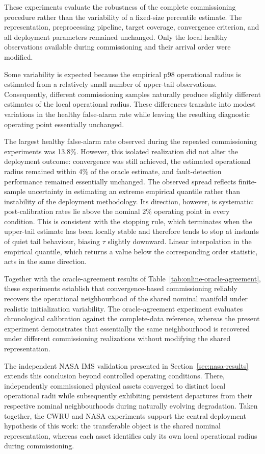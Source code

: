 \documentclass{trbunofficial}
\begin{document}
These experiments evaluate the robustness of the complete commissioning
procedure rather than the variability of a fixed-size percentile estimate.
The representation, preprocessing pipeline, target coverage, convergence
criterion, and all deployment parameters remained unchanged. Only the local
healthy observations available during commissioning and their arrival order
were modified.

Some variability is expected because the empirical p98 operational radius is
estimated from a relatively small number of upper-tail observations.
Consequently, different commissioning samples naturally produce slightly
different estimates of the local operational radius. These differences
translate into modest variations in the healthy false-alarm rate while
leaving the resulting diagnostic operating point essentially unchanged.

The largest healthy false-alarm rate observed during the repeated
commissioning experiments was 13.8\%. However, this isolated realization did
not alter the deployment outcome: convergence was still achieved, the
estimated operational radius remained within 4\% of the oracle estimate,
and fault-detection performance remained essentially unchanged.
The observed spread reflects finite-sample uncertainty in estimating an extreme
empirical quantile rather than instability of the deployment methodology. Its
direction, however, is systematic: post-calibration rates lie above the nominal
2\% operating point in every condition. This is consistent with the stopping
rule, which terminates when the upper-tail estimate has been locally stable and
therefore tends to stop at instants of quiet tail behaviour, biasing $\tau$
slightly downward. Linear interpolation in the empirical quantile, which
returns a value below the corresponding order statistic, acts in the same
direction.

Together with the oracle-agreement results of
Table~\ref{tab:online-oracle-agreement}, these experiments establish that
convergence-based commissioning reliably recovers the operational
neighbourhood of the shared nominal manifold under realistic initialization
variability. The oracle-agreement experiment evaluates chronological
calibration against the complete-data reference, whereas the present
experiment demonstrates that essentially the same neighbourhood is recovered
under different commissioning realizations without modifying the shared
representation.

The independent NASA IMS validation presented in
Section~\ref{sec:nasa-results} extends this conclusion beyond controlled
operating conditions. There, independently commissioned physical assets
converged to distinct local operational radii while subsequently exhibiting
persistent departures from their respective nominal neighbourhoods during
naturally evolving degradation. Taken together, the CWRU and NASA
experiments support the central deployment hypothesis of this work: the
transferable object is the shared nominal representation, whereas each asset
identifies only its own local operational radius during commissioning.
\end{document}
